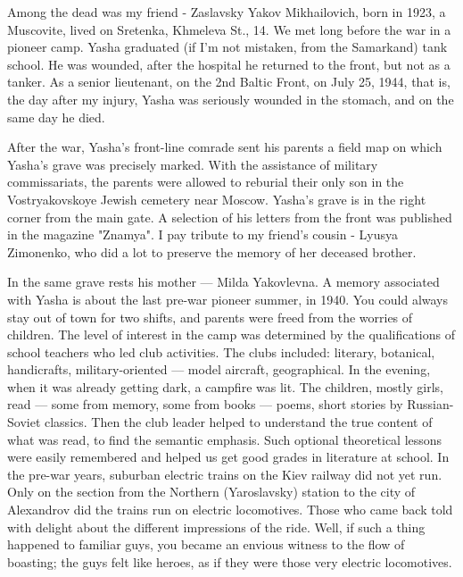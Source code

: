 \label{15-2}
Among the dead was my friend - Zaslavsky Yakov Mikhailovich, born in 1923, a Muscovite, lived on Sretenka, Khmeleva St., 14. We met long before the war in a pioneer camp. Yasha graduated (if I'm not mistaken, from the Samarkand) tank school. He was wounded, after the hospital he returned to the front, but not as a tanker. As a senior lieutenant, on the 2nd Baltic Front, on July 25, 1944, that is, the day after my injury, Yasha was seriously wounded in the stomach, and on the same day he died.

\label{15-3}
After the war, Yasha's front-line comrade sent his parents a field map on which Yasha's grave was precisely marked. With the assistance of military commissariats, the parents were allowed to reburial their only son in the Vostryakovskoye Jewish cemetery near Moscow. Yasha's grave is in the right corner from the main gate. A selection of his letters from the front was published in the magazine "Znamya". I pay tribute to my friend's cousin - Lyusya Zimonenko, who did a lot to preserve the memory of her deceased brother.

\label{16-1}
In the same grave rests his mother — Milda Yakovlevna. A memory associated with Yasha is about the last pre-war pioneer summer, in 1940. You could always stay out of town for two shifts, and parents were freed from the worries of children. The level of interest in the camp was determined by the qualifications of school teachers who led club activities. The clubs included: literary, botanical, handicrafts, military-oriented — model aircraft, geographical. In the evening, when it was already getting dark, a campfire was lit. The children, mostly girls, read — some from memory, some from books — poems, short stories by Russian-Soviet classics. Then the club leader helped to understand the true content of what was read, to find the semantic emphasis. Such optional theoretical lessons were easily remembered and helped us get good grades in literature at school. In the pre-war years, suburban electric trains on the Kiev railway did not yet run. Only on the section from the Northern (Yaroslavsky) station to the city of Alexandrov did the trains run on electric locomotives. Those who came back told with delight about the different impressions of the ride. Well, if such a thing happened to familiar guys, you became an envious witness to the flow of boasting; the guys felt like heroes, as if they were those very electric locomotives.


